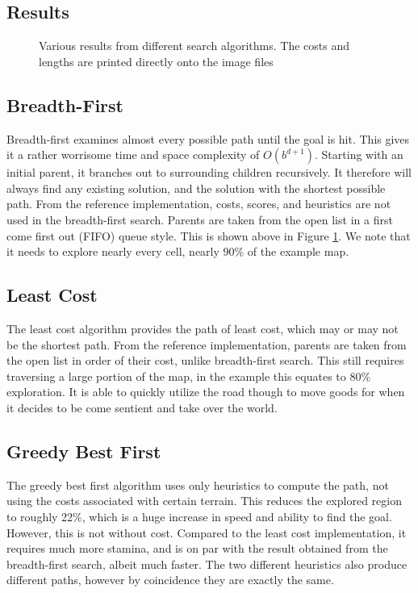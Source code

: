 \documentclass[11pt,letterpaper]{article}
\begin{document}
\subsection{Results}

\begin{figure}[H]
    \centering

    \qquad
    \qquad
    \qquad
    \qquad
    \qquad
    \caption{Various results from different search algorithms. The costs and lengths are printed directly onto the image files}
    \label{fig:breadth-first}
\end{figure}

\subsection{Breadth-First}
Breadth-first examines almost every possible path until the goal is hit.
This gives it a rather worrisome time and space complexity of $O(b^{d+1})$.
Starting with an initial parent, it branches out to surrounding children recursively.
It therefore will always find any existing solution, and the solution with the shortest possible path.
From the reference implementation, costs, scores, and heuristics are not used in the breadth-first search. Parents are taken from the open list in a first come first out (FIFO) queue style.
This is shown above in Figure \ref{fig:breadth-first}.
We note that it needs to explore nearly every cell, nearly 90\% of the example map.

\subsection{Least Cost}
The least cost algorithm provides the path of least cost, which may or may not be the shortest path.
From the reference implementation, parents are taken from the open list in order of their cost, unlike breadth-first search. This still requires traversing a large portion of the map, in the example this equates to 80\% exploration.
It is able to quickly utilize the road though to move goods for when it decides to be come sentient and take over the world.

\subsection{Greedy Best First}
The greedy best first algorithm uses only heuristics to compute the path, not using the costs associated with certain terrain.
This reduces the explored region to roughly 22\%, which is a huge increase in speed and ability to find the goal.
However, this is not without cost.
Compared to the least cost implementation, it requires much more stamina, and is on par with the result obtained from the breadth-first search, albeit much faster.
The two different heuristics also produce different paths, however by coincidence they are exactly the same.
\end{document}
